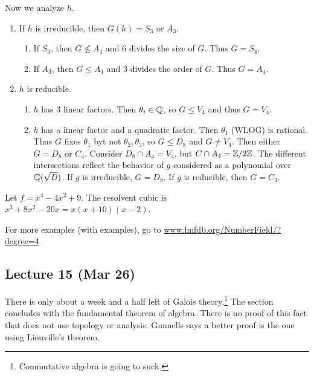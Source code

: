 \documentclass[10pt, twoside]{article}
\begin{document}
        Now we analyze $h$.  \begin{enumerate} \item If $h$ is irreducible,
            then $G(h) = S_3$ or $A_3$.  \begin{enumerate}[label=(\alph*)]
                \item If $S_3$, then $G \not\leq A_4$ and $6$ divides the size
                    of $G$. Thus $G = S_4$.  \item If $A_3$, then $G \leq A_4$
                    and $3$ divides the order of $G$. Thus $G = A_4$.
                \end{enumerate} \item $h$ is reducible.  \begin{enumerate}
                \item $h$ has $3$ linear factors. Then $\theta_i \in \mathbb{Q}$, so $G
                    \leq V_4$ and thus $G = V_4$.  \item $h$ has a linear
                    factor and a quadratic factor. Then $\theta_1$ (WLOG) is
                    rational. Thus $G$ fixes $\theta_1$ byt not $\theta_2,
                    \theta_3$, so $G \leq D_8$ and $G \neq V_4$. Then either $G
                    = D_8$ or $C_4$. Consider $D_8 \cap A_4 = V_4$, but $C \cap
                    A_4 = \mathbb{Z}/2\mathbb{Z}$. The different intersections reflect the
                    behavior of $g$ considered as a polynomial over
                    $\mathbb{Q}(\sqrt{D})$. If $g$ is irreducible, $G = D_8$. If $g$ is
                    reducible, then $G = C_4$.  \end{enumerate} \end{enumerate}
        
        \begin{exm} Let $f = x^4 - 4x^2 + 9$. The resolvent cubic is
        $x^3+8x^2-20x = x(x+10)(x-2)$.  \end{exm}

        \begin{exm} For more examples (with examples), go to
        \url{www.lmfdb.org/NumberField/?degree=4} \end{exm}

        \subsection{Lecture 15 (Mar 26)} There is only about a week and a half
        left of Galois theory.\footnote{Commutative algebra is going to suck.}
        The section concludes with the fundamental theorem of algebra. There is
        no proof of this fact that does not use topology or analysis. Gunnells
        says a better proof is the one using Liouville's theorem.
        
\end{document}
